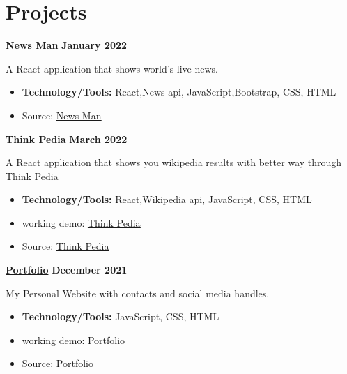 \documentclass[letterpaper, 11pt]{article}
\newcommand{\bulletSpace}{\vspace{-8pt}}
\newcommand{\secStartSpace}{\vspace{3pt}}
\newcommand{\secEndSpace}{\vspace{5pt}}
\newcommand{\spaceCollapse}{\vspace{-5pt}}
\begin{document}
\section{\color{blue} \textbf{Projects}}
\secStartSpace

\begin{addmargin}[1em]{1em}
		
	\noindent\href{https://github.com/sukhlotey/newsdaily}{\textbf{News Man}}  \hfill \textbf{January 2022} 
		
	\noindent A React application that shows world's live news.
	\spaceCollapse
	\begin{itemize}
		\item \textbf{Technology/Tools:} React,News api, JavaScript,Bootstrap, CSS, HTML
		      \bulletSpace
		\item Source:  \href{https://github.com/sukhlotey/newsdaily}{\underline{News Man}}
	\end{itemize}
	
	\noindent\href{https://github.com/sukhlotey/think-pedia}{\textbf{Think Pedia}}  \hfill \textbf{March 2022} 
		
	\noindent A React application that shows you wikipedia results with better way through Think Pedia
	\spaceCollapse
	\begin{itemize}
		\item \textbf{Technology/Tools:} React,Wikipedia api, JavaScript, CSS, HTML
		      \bulletSpace
		\item working demo:  \href{https://thinkpedia.netlify.app/}{\underline{Think Pedia}}
           \item Source:  \href{https://github.com/sukhlotey/think-pedia}{\underline{Think Pedia}}
	\end{itemize}
	\noindent\href{https://github.com/sukhlotey/website}{\textbf{Portfolio}}  \hfill \textbf{December 2021} 
		
	\noindent My Personal Website with contacts and social media handles.
	\spaceCollapse
	\begin{itemize}
		\item \textbf{Technology/Tools:} JavaScript, CSS, HTML
		      \bulletSpace
		\item working demo:  \href{https://sukhlotey.github.io/website/}{\underline{Portfolio}}
           \item Source:  \href{https://github.com/sukhlotey/website}{\underline{Portfolio}}
	\end{itemize}
		
\end{addmargin}
\secEndSpace
\end{document}
